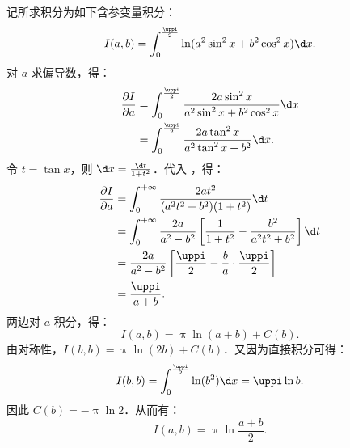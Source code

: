 \begin{solution}

    记所求积分为如下含参变量积分：
    \begin{equation}\label{eq:int1-def}
        I(a, b) = \int_0^{\frac{\uppi}{2}} \ln(a^2 \sin^2 x + b^2 \cos^2 x) \d x.
    \end{equation}
    对 $a$ 求偏导数，得：
    \begin{equation}\label{eq:int1-deriv}
        \begin{aligned}
            \frac{\partial I}{\partial a} & = \int_0^{\frac{\uppi}{2}} \frac{2a \sin^2 x}{a^2 \sin^2 x + b^2 \cos^2 x} \d x \\
                                          & = \int_0^{\frac{\uppi}{2}} \frac{2a \tan^2 x}{a^2 \tan^2 x + b^2} \d x.
        \end{aligned}
    \end{equation}
    令 $t = \tan x$，则 $\d x = \frac{\d t}{1 + t^2}$．代入 ，得：
    \begin{equation}
        \begin{aligned}
            \frac{\partial I}{\partial a} & = \int_0^{+\infty} \frac{2a t^2}{(a^2 t^2 + b^2)(1 + t^2)} \d t                                           \\
                                          & = \int_0^{+\infty} \frac{2a}{a^2 - b^2} \left[ \frac{1}{1 + t^2} - \frac{b^2}{a^2 t^2 + b^2} \right] \d t \\
                                          & = \frac{2a}{a^2 - b^2} \left[ \frac{\uppi}{2} - \frac{b}{a} \cdot \frac{\uppi}{2} \right]                 \\
                                          & = \frac{\uppi}{a + b}.
        \end{aligned}
    \end{equation}
    两边对 $a$ 积分，得：
    \begin{equation}
        I(a, b) = \uppi \ln(a + b) + C(b).
    \end{equation}
    由对称性，$I(b, b) = \uppi \ln(2b) + C(b)$．又因为直接积分可得：
    \begin{equation}
        I(b, b) = \int_0^{\frac{\uppi}{2}} \ln(b^2) \d x = \uppi \ln b.
    \end{equation}
    因此 $C(b) = -\uppi \ln 2$．从而有：
    \begin{equation}
        \boxed{I(a, b) = \uppi \ln \frac{a + b}{2}}.
    \end{equation}


\end{solution}
